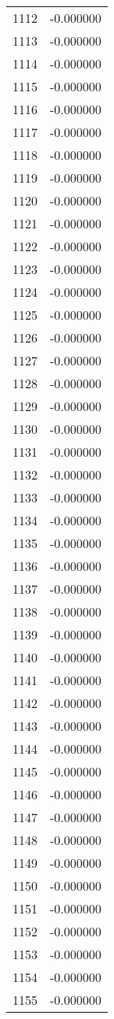 \documentclass[12pt]{article}
\begin{document}
\begin{longtable}{@{}cc@{}}
1112 & -0.000000 \\
1113 & -0.000000 \\
1114 & -0.000000 \\
1115 & -0.000000 \\
1116 & -0.000000 \\
1117 & -0.000000 \\
1118 & -0.000000 \\
1119 & -0.000000 \\
1120 & -0.000000 \\
1121 & -0.000000 \\
1122 & -0.000000 \\
1123 & -0.000000 \\
1124 & -0.000000 \\
1125 & -0.000000 \\
1126 & -0.000000 \\
1127 & -0.000000 \\
1128 & -0.000000 \\
1129 & -0.000000 \\
1130 & -0.000000 \\
1131 & -0.000000 \\
1132 & -0.000000 \\
1133 & -0.000000 \\
1134 & -0.000000 \\
1135 & -0.000000 \\
1136 & -0.000000 \\
1137 & -0.000000 \\
1138 & -0.000000 \\
1139 & -0.000000 \\
1140 & -0.000000 \\
1141 & -0.000000 \\
1142 & -0.000000 \\
1143 & -0.000000 \\
1144 & -0.000000 \\
1145 & -0.000000 \\
1146 & -0.000000 \\
1147 & -0.000000 \\
1148 & -0.000000 \\
1149 & -0.000000 \\
1150 & -0.000000 \\
1151 & -0.000000 \\
1152 & -0.000000 \\
1153 & -0.000000 \\
1154 & -0.000000 \\
1155 & -0.000000 \\

\end{longtable}
\end{document}
